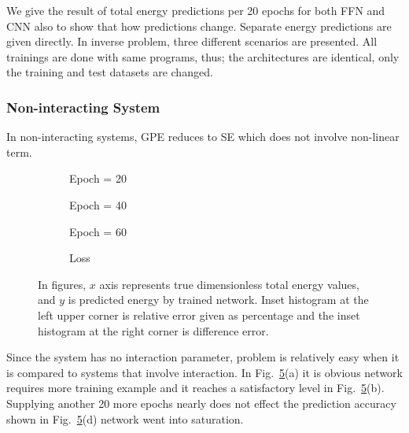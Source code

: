 \documentclass[a4paper,times,12pt]{article}
\begin{document}
We give the result of total energy predictions per 20 epochs for both FFN and CNN also to show that how predictions change. Separate energy predictions are given directly. In inverse problem, three different scenarios are presented. All trainings are done with same programs, thus; the architectures are identical, only the training and test datasets are changed. 

\subsubsection{Non-interacting System}

In non-interacting systems, GPE reduces to SE which does not involve non-linear term. 

\begin{figure}[H]
    \centering
    \begin{subfigure}[t]{0.45\textwidth}
        
        \caption{Epoch = 20}
		\label{fig:a}
    \end{subfigure}
    \begin{subfigure}[t]{0.45\textwidth}
        
        \caption{Epoch = 40}
		\label{fig:b}
    \end{subfigure}
    \begin{subfigure}[t]{0.45\textwidth}
        
        \caption{Epoch = 60}
		\label{fig:c}
    \end{subfigure}
    \begin{subfigure}[t]{0.45\textwidth}
        
        \caption{Loss}
		\label{fig:d}
    \end{subfigure}
    \caption{In figures, $x$ axis represents true dimensionless total energy values, and $y$ is predicted energy by trained network. Inset histogram at the left upper corner is relative error given as percentage and the inset histogram at the right corner is difference error.}
\label{fig:FFN-g-0}
\end{figure}

Since the system has no interaction parameter, problem is relatively easy when it is compared to systems that involve interaction. In Fig.~\ref{fig:FFN-g-0}(a) it is obvious network requires more training example and it reaches a satisfactory level in Fig.~\ref{fig:FFN-g-0}(b). Supplying another 20 more epochs nearly does not effect the prediction accuracy shown in Fig.~\ref{fig:FFN-g-0}(d) network went into saturation.
\end{document}
